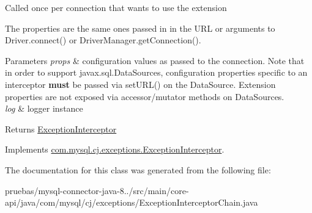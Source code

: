 Called once per connection that wants to use the extension

The properties are the same ones passed in in the U\+RL or arguments to Driver.\+connect() or Driver\+Manager.\+get\+Connection().


\begin{DoxyParams}{Parameters}
{\em props} & configuration values as passed to the connection. Note that in order to support javax.\+sql.\+Data\+Sources, configuration properties specific to an interceptor {\bfseries must} be passed via set\+U\+R\+L() on the Data\+Source. Extension properties are not exposed via accessor/mutator methods on Data\+Sources. \\
\hline
{\em log} & logger instance \\
\hline
\end{DoxyParams}
\begin{DoxyReturn}{Returns}
\mbox{\hyperlink{interfacecom_1_1mysql_1_1cj_1_1exceptions_1_1_exception_interceptor}{Exception\+Interceptor}} 
\end{DoxyReturn}


Implements \mbox{\hyperlink{interfacecom_1_1mysql_1_1cj_1_1exceptions_1_1_exception_interceptor_a5488d80601434446f3f5f73c27226417}{com.\+mysql.\+cj.\+exceptions.\+Exception\+Interceptor}}.



The documentation for this class was generated from the following file\+:\begin{DoxyCompactItemize}
\item 
pruebas/mysql-\/connector-\/java-\/8../src/main/core-\/api/java/com/mysql/cj/exceptions/Exception\+Interceptor\+Chain.\+java\end{DoxyCompactItemize}
